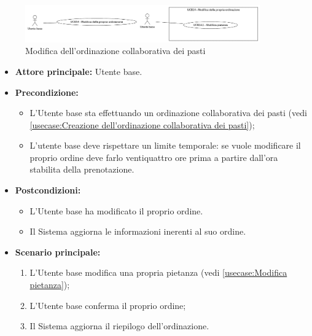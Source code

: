 \newpage
{}
\label{usecase:Modifica della propria ordinazione}

\begin{figure}[h]
	\centering
	\includegraphics[width=0.9\textwidth]{./uml/UCBmod_ord.png} 
	\caption{Modifica dell'ordinazione collaborativa dei pasti}
	\label{fig:UCBmod_ord}
  \end{figure}

\begin{itemize}
	\item \textbf{Attore principale:} Utente base.

	\item \textbf{Precondizione:}
	      \begin{itemize}
		      \item L'Utente base sta effettuando un ordinazione collaborativa dei pasti (vedi \autoref{usecase:Creazione dell'ordinazione collaborativa dei pasti});
		      \item L'utente base deve rispettare un limite temporale: se vuole modificare il proprio ordine deve farlo ventiquattro ore prima a partire dall'ora stabilita della prenotazione.
	      \end{itemize}

	\item \textbf{Postcondizioni:}
	      \begin{itemize}
		      \item L'Utente base ha modificato il proprio ordine.
		      \item Il Sistema aggiorna le informazioni inerenti al suo ordine.
	      \end{itemize}

	\item \textbf{Scenario principale:}
	      \begin{enumerate}
		      \item L'Utente base modifica una propria pietanza (vedi \autoref{usecase:Modifica pietanza});
		      \item L'Utente base conferma il proprio ordine;
		      \item Il Sistema aggiorna il riepilogo dell'ordinazione.
	      \end{enumerate}
\end{itemize}

